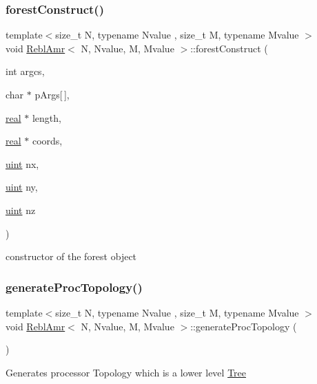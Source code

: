 \subsubsection{\texorpdfstring{forest\+Construct()}{forestConstruct()}}
{\footnotesize\ttfamily template$<$size\+\_\+t N, typename Nvalue , size\+\_\+t M, typename Mvalue $>$ \\
void \mbox{\hyperlink{classReblAmr}{Rebl\+Amr}}$<$ N, Nvalue, M, Mvalue $>$\+::forest\+Construct (\begin{DoxyParamCaption}\item[{int}]{argcs,  }\item[{char $\ast$}]{p\+Args\mbox{[}$\,$\mbox{]},  }\item[{\mbox{\hyperlink{definitions_8h_aedc0ad84d1e764530814f57ad931d02a}{real}} $\ast$}]{length,  }\item[{\mbox{\hyperlink{definitions_8h_aedc0ad84d1e764530814f57ad931d02a}{real}} $\ast$}]{coords,  }\item[{\mbox{\hyperlink{definitions_8h_a69aa29b598b851b0640aa225a9e5d61d}{uint}}}]{nx,  }\item[{\mbox{\hyperlink{definitions_8h_a69aa29b598b851b0640aa225a9e5d61d}{uint}}}]{ny,  }\item[{\mbox{\hyperlink{definitions_8h_a69aa29b598b851b0640aa225a9e5d61d}{uint}}}]{nz }\end{DoxyParamCaption})}

constructor of the forest object \mbox{\label{classReblAmr_a907b8f289b180b19c23a50ad63a2cfde}} 
\subsubsection{\texorpdfstring{generate\+Proc\+Topology()}{generateProcTopology()}}
{\footnotesize\ttfamily template$<$size\+\_\+t N, typename Nvalue , size\+\_\+t M, typename Mvalue $>$ \\
void \mbox{\hyperlink{classReblAmr}{Rebl\+Amr}}$<$ N, Nvalue, M, Mvalue $>$\+::generate\+Proc\+Topology (\begin{DoxyParamCaption}{ }\end{DoxyParamCaption})}

Generates processor Topology which is a lower level \mbox{\hyperlink{classTree}{Tree}} \mbox{\label{classReblAmr_acd82ccef4a03c7c8c75e1cd4923d9eaa}} 
